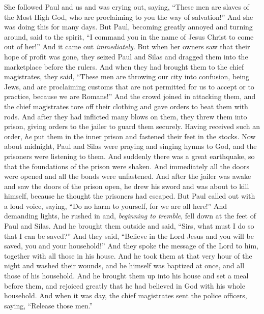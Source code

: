 \begin{biblechapter}
\verse She followed Paul and us and was crying out, saying, “These men are slaves of the Most High God, who are proclaiming to you the way of salvation!”
\verse And she was doing this for many days. But Paul, becoming greatly annoyed and turning around, said to the spirit, “I command you in the name of Jesus Christ to come out of her!” And it came out \textit{immediately}.
\verse But when her owners saw that their hope of profit was gone, they seized Paul and Silas and dragged them into the marketplace before the rulers.
\verse And when they had brought them to the chief magistrates, they said, “These men are throwing our city into confusion, being Jews,
\verse and are proclaiming customs that are not permitted for us to accept or to practice, because we are Romans!”
\verse And the crowd joined in attacking them, and the chief magistrates tore off their clothing and gave orders to beat them with rods.
\verse And after they had inflicted many blows on them, they threw them into prison, giving orders to the jailer to guard them securely.
\verse Having received such an order, \textit{he} put them in the inner prison and fastened their feet in the stocks.
 Now about midnight, Paul and Silas were praying and singing hymns to God, and the prisoners were listening to them.
\verse And suddenly there was a great earthquake, so that the foundations of the prison were shaken. And immediately all the doors were opened and all the bonds were unfastened.
\verse And after the jailer was awake and saw the doors of the prison open, he drew his sword and was about to kill himself, because he thought the prisoners had escaped.
\verse But Paul called out with a loud voice, saying, “Do no harm to yourself, for we are all here!”
\verse And demanding lights, he rushed in and, \textit{beginning to tremble}, fell down at the feet of Paul and Silas.
\verse And he brought them outside and said, “Sirs, what must I do so that I can be saved?”
\verse And they said, “Believe in the Lord Jesus and you will be saved, you and your household!”
\verse And they spoke the message of the Lord to him, together with all those in his house.
\verse And he took them at that very hour of the night and washed their wounds, and he himself was baptized at once, and all those of his household.
\verse And he brought them up into his house and set a meal before them, and rejoiced greatly that he had believed in God with his whole household.
 And when it was day, the chief magistrates sent the police officers, saying, “Release those men.”

\end{biblechapter}
